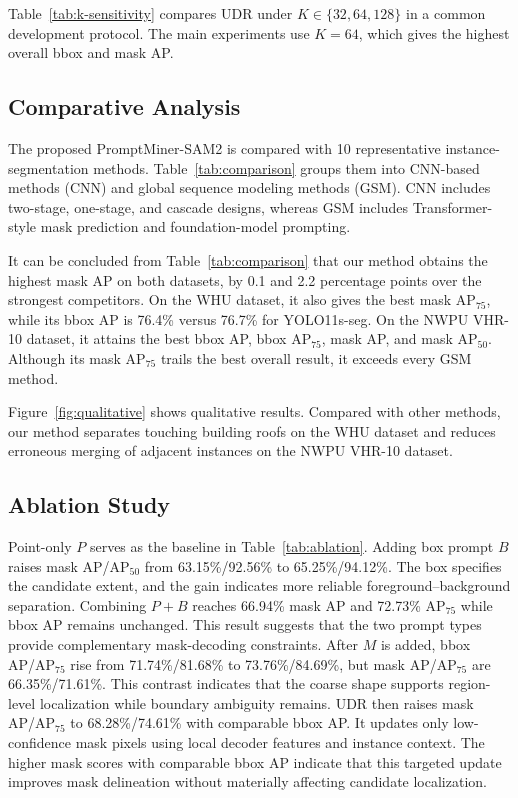 \documentclass{article}
\begin{document}
Table~\ref{tab:k-sensitivity} compares UDR under $K\in\{32,64,128\}$ in a common development protocol. The main experiments use $K=64$, which gives the highest overall bbox and mask AP.




\subsection{Comparative Analysis}
 The proposed PromptMiner-SAM2 is compared with 10 representative
instance-segmentation methods. Table~\ref{tab:comparison} groups them into CNN-based methods (CNN) and global sequence modeling methods (GSM). CNN includes two-stage, one-stage, and cascade designs, whereas GSM includes Transformer-style mask prediction and foundation-model prompting.

It can be concluded from Table~\ref{tab:comparison} that our method obtains
the highest mask AP on both datasets, by 0.1 and 2.2 percentage points over the strongest competitors. On the WHU dataset, it also gives the best mask AP$_{75}$, while its bbox AP is 76.4\% versus 76.7\% for YOLO11s-seg. On the NWPU VHR-10 dataset, it attains the best bbox AP, bbox AP$_{75}$, mask AP, and mask AP$_{50}$. Although its mask AP$_{75}$ trails the best overall result, it exceeds every GSM method.

Figure~\ref{fig:qualitative} shows qualitative results. Compared with other methods, our method separates touching building roofs on the WHU dataset and reduces erroneous merging of adjacent instances on the NWPU VHR-10 dataset.

\subsection{Ablation Study}
\vspace{-0.35em}
Point-only $P$ serves as the baseline in Table~\ref{tab:ablation}. Adding box prompt $B$ raises mask AP/AP$_{50}$ from 63.15\%/92.56\% to 65.25\%/94.12\%. 
The box specifies the candidate extent, and the gain indicates more reliable foreground--background separation.
Combining $P{+}B$ reaches 66.94\% mask AP and 72.73\% AP$_{75}$ while bbox AP remains unchanged.
This result suggests that the two prompt types provide complementary mask-decoding constraints.
After $M$ is added, bbox AP/AP$_{75}$ rise from 71.74\%/81.68\% to 73.76\%/84.69\%, but mask AP/AP$_{75}$ are 66.35\%/71.61\%. 
This contrast indicates that the coarse shape supports region-level localization while boundary ambiguity remains. 
UDR then raises mask AP/AP$_{75}$ to 68.28\%/74.61\% with comparable bbox AP. It updates only low-confidence mask pixels using local decoder features and instance context. The higher mask scores with comparable bbox AP indicate that this targeted update improves mask delineation without materially affecting candidate localization.
\end{document}
